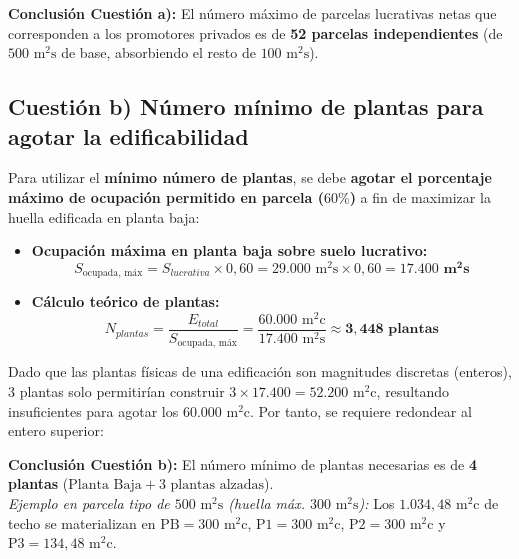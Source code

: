 \documentclass[11pt,a4paper]{article}
\begin{document}
\begin{tcolorbox}[basebox, colframe=legalgreen, colback=legalgreen!5!white]
  \textbf{\color{legalgreen} Conclusión Cuestión a):} El número máximo de parcelas lucrativas netas que corresponden a los promotores privados es de \textbf{52 parcelas independientes} (de $500\text{ m}^2\text{s}$ de base, absorbiendo el resto de $100\text{ m}^2\text{s}$).
\end{tcolorbox}

\subsection{Cuestión b) Número mínimo de plantas para agotar la edificabilidad}

Para utilizar el \textbf{mínimo número de plantas}, se debe \textbf{agotar el porcentaje máximo de ocupación permitido en parcela ($60\%$)} a fin de maximizar la huella edificada en planta baja:

\begin{itemize}
  \item \textbf{Ocupación máxima en planta baja sobre suelo lucrativo:}
  \[
    S_{\text{ocupada, máx}} = S_{lucrativa} \times 0,60 = 29.000\text{ m}^2\text{s} \times 0,60 = \mathbf{17.400\text{ m}^2\text{s}}
  \]
  \item \textbf{Cálculo teórico de plantas:}
  \[
    N_{plantas} = \frac{E_{total}}{S_{\text{ocupada, máx}}} = \frac{60.000\text{ m}^2\text{c}}{17.400\text{ m}^2\text{s}} \approx \mathbf{3,448\text{ plantas}}
  \]
\end{itemize}

Dado que las plantas físicas de una edificación son magnitudes discretas (enteros), $3$ plantas solo permitirían construir $3 \times 17.400 = 52.200\text{ m}^2\text{c}$, resultando insuficientes para agotar los $60.000\text{ m}^2\text{c}$. Por tanto, se requiere redondear al entero superior:

\begin{tcolorbox}[basebox, colframe=navyblue, colback=navyblue!5!white]
  \textbf{\color{navyblue} Conclusión Cuestión b):} El número mínimo de plantas necesarias es de \textbf{4 plantas} ($\text{Planta Baja} + 3\text{ plantas alzadas}$).\\
  \small\textit{Ejemplo en parcela tipo de $500\text{ m}^2\text{s}$ (huella máx. $300\text{ m}^2\text{s}$):} Los $1.034,48\text{ m}^2\text{c}$ de techo se materializan en $\text{PB} = 300\text{ m}^2\text{c}$, $\text{P1} = 300\text{ m}^2\text{c}$, $\text{P2} = 300\text{ m}^2\text{c}$ y $\text{P3} = 134,48\text{ m}^2\text{c}$.
\end{tcolorbox}
\end{document}
